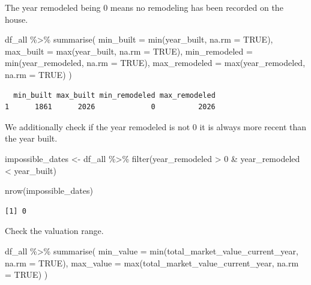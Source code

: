 \documentclass[
  english,
  letterpaper,
  DIV=11,
  numbers=noendperiod]{scrreprt}
\newenvironment{Shaded}{\begin{snugshade}}{\end{snugshade}}
\newcommand{\AttributeTok}[1]{\textcolor[rgb]{0.40,0.45,0.13}{#1}}
\newcommand{\ConstantTok}[1]{\textcolor[rgb]{0.56,0.35,0.01}{#1}}
\newcommand{\DecValTok}[1]{\textcolor[rgb]{0.68,0.00,0.00}{#1}}
\newcommand{\FunctionTok}[1]{\textcolor[rgb]{0.28,0.35,0.67}{#1}}
\newcommand{\NormalTok}[1]{\textcolor[rgb]{0.00,0.23,0.31}{#1}}
\newcommand{\OtherTok}[1]{\textcolor[rgb]{0.00,0.23,0.31}{#1}}
\newcommand{\SpecialCharTok}[1]{\textcolor[rgb]{0.37,0.37,0.37}{#1}}
\begin{document}
The year remodeled being 0 means no remodeling has been recorded on the
house.

\begin{Shaded}
\begin{Highlighting}[]
\NormalTok{df\_all }\SpecialCharTok{\%\textgreater{}\%}
  \FunctionTok{summarise}\NormalTok{(}
    \AttributeTok{min\_built     =} \FunctionTok{min}\NormalTok{(year\_built, }\AttributeTok{na.rm =} \ConstantTok{TRUE}\NormalTok{),}
    \AttributeTok{max\_built     =} \FunctionTok{max}\NormalTok{(year\_built, }\AttributeTok{na.rm =} \ConstantTok{TRUE}\NormalTok{),}
    \AttributeTok{min\_remodeled =} \FunctionTok{min}\NormalTok{(year\_remodeled, }\AttributeTok{na.rm =} \ConstantTok{TRUE}\NormalTok{),}
    \AttributeTok{max\_remodeled =} \FunctionTok{max}\NormalTok{(year\_remodeled, }\AttributeTok{na.rm =} \ConstantTok{TRUE}\NormalTok{)}
\NormalTok{  )}
\end{Highlighting}
\end{Shaded}

\begin{verbatim}
  min_built max_built min_remodeled max_remodeled
1      1861      2026             0          2026
\end{verbatim}

We additionally check if the year remodeled is not 0 it is always more
recent than the year built.

\begin{Shaded}
\begin{Highlighting}[]
\NormalTok{impossible\_dates }\OtherTok{\textless{}{-}}\NormalTok{ df\_all }\SpecialCharTok{\%\textgreater{}\%}
  \FunctionTok{filter}\NormalTok{(year\_remodeled }\SpecialCharTok{\textgreater{}} \DecValTok{0} \SpecialCharTok{\&}\NormalTok{ year\_remodeled }\SpecialCharTok{\textless{}}\NormalTok{ year\_built)}

\FunctionTok{nrow}\NormalTok{(impossible\_dates)}
\end{Highlighting}
\end{Shaded}

\begin{verbatim}
[1] 0
\end{verbatim}

Check the valuation range.

\begin{Shaded}
\begin{Highlighting}[]
\NormalTok{df\_all }\SpecialCharTok{\%\textgreater{}\%}
  \FunctionTok{summarise}\NormalTok{(}
    \AttributeTok{min\_value     =} \FunctionTok{min}\NormalTok{(total\_market\_value\_current\_year, }\AttributeTok{na.rm =} \ConstantTok{TRUE}\NormalTok{),}
    \AttributeTok{max\_value     =} \FunctionTok{max}\NormalTok{(total\_market\_value\_current\_year, }\AttributeTok{na.rm =} \ConstantTok{TRUE}\NormalTok{)}
\NormalTok{  )}
\end{Highlighting}
\end{Shaded}
\end{document}

